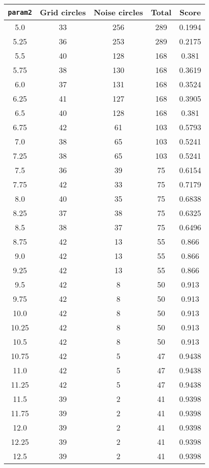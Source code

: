 \documentclass[letterpaper, 12pt]{article}
\begin{document}
\begin{longtable}{|c|c|c|c|c|}
\hline
\textbf{\texttt{param2}} & \textbf{Grid circles} & \textbf{Noise circles} & \textbf{Total} & \textbf{Score} \\
\hline
5.0 & 33 & 256 & 289 & 0.1994 \\
\hline
5.25 & 36 & 253 & 289 & 0.2175 \\
\hline
5.5 & 40 & 128 & 168 & 0.381 \\
\hline
5.75 & 38 & 130 & 168 & 0.3619 \\
\hline
6.0 & 37 & 131 & 168 & 0.3524 \\
\hline
6.25 & 41 & 127 & 168 & 0.3905 \\
\hline
6.5 & 40 & 128 & 168 & 0.381 \\
\hline
6.75 & 42 & 61 & 103 & 0.5793 \\
\hline
7.0 & 38 & 65 & 103 & 0.5241 \\
\hline
7.25 & 38 & 65 & 103 & 0.5241 \\
\hline
7.5 & 36 & 39 & 75 & 0.6154 \\
\hline
7.75 & 42 & 33 & 75 & 0.7179 \\
\hline
8.0 & 40 & 35 & 75 & 0.6838 \\
\hline
8.25 & 37 & 38 & 75 & 0.6325 \\
\hline
8.5 & 38 & 37 & 75 & 0.6496 \\
\hline
8.75 & 42 & 13 & 55 & 0.866 \\
\hline
9.0 & 42 & 13 & 55 & 0.866 \\
\hline
9.25 & 42 & 13 & 55 & 0.866 \\
\hline
9.5 & 42 & 8 & 50 & 0.913 \\
\hline
9.75 & 42 & 8 & 50 & 0.913 \\
\hline
10.0 & 42 & 8 & 50 & 0.913 \\
\hline
10.25 & 42 & 8 & 50 & 0.913 \\
\hline
10.5 & 42 & 8 & 50 & 0.913 \\
\hline
10.75 & 42 & 5 & 47 & 0.9438 \\
\hline
11.0 & 42 & 5 & 47 & 0.9438 \\
\hline
11.25 & 42 & 5 & 47 & 0.9438 \\
\hline
11.5 & 39 & 2 & 41 & 0.9398 \\
\hline
11.75 & 39 & 2 & 41 & 0.9398 \\
\hline
12.0 & 39 & 2 & 41 & 0.9398 \\
\hline
12.25 & 39 & 2 & 41 & 0.9398 \\
\hline
12.5 & 39 & 2 & 41 & 0.9398 \\

\end{longtable}
\end{document}

